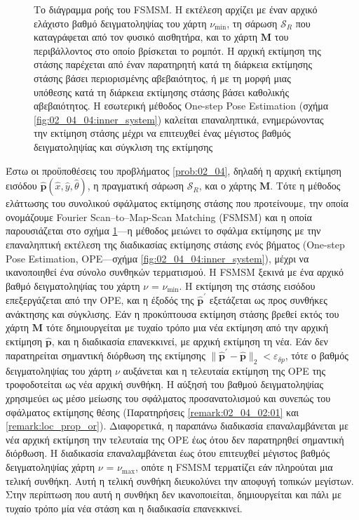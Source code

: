 \begin{figure}[!h]\centering
  
  \caption{\small Το διάγραμμα ροής του FSMSM. Η εκτέλεση αρχίζει με έναν αρχικό
           ελάχιστο βαθμό δειγματοληψίας του χάρτη $\nu_{\min}$, τη σάρωση
           $\mathcal{S}_R$ που καταγράφεται από τον φυσικό αισθητήρα, και το
           χάρτη $\bm{M}$ του περιβάλλοντος στο οποίο βρίσκεται το ρομπότ. Η
           αρχική εκτίμηση της στάσης παρέχεται από έναν παρατηρητή κατά τη
           διάρκεια εκτίμησης στάσης βάσει περιορισμένης αβεβαιότητος, ή με τη
           μορφή μιας υπόθεσης κατά τη διάρκεια εκτίμησης στάσης βάσει καθολικής
           αβεβαιότητος. Η εσωτερική μέθοδος One-step Pose Estimation (σχήμα
           \ref{fig:02_04_04:inner_system}) καλείται επαναληπτικά, ενημερώνοντας
           την εκτίμηση στάσης μέχρι να επιτευχθεί ένας μέγιστος βαθμός
           δειγματοληψίας και σύγκλιση της εκτίμησης}
  \label{fig:02_04_04:outer_system}
\end{figure}

Έστω οι προϋποθέσεις του προβλήματος \ref{prob:02_04}, δηλαδή η αρχική εκτίμηση
εισόδου $\hat{\bm{p}}(\hat{x}, \hat{y}, \hat{\theta})$, η πραγματική σάρωση
$\mathcal{S}_R$, και ο χάρτης $\bm{M}$. Τότε η μέθοδος ελάττωσης του συνολικού
σφάλματος εκτίμησης στάσης που προτείνουμε, την οποία ονομάζουμε Fourier
Scan--to--Map-Scan Matching (FSMSM) και η οποία παρουσιάζεται στο σχήμα
\ref{fig:02_04_04:outer_system}---η μέθοδος μειώνει το σφάλμα εκτίμησης με την
επαναληπτική εκτέλεση της διαδικασίας εκτίμησης στάσης ενός βήματος (One-step
Pose Estimation, OPE---σχήμα \ref{fig:02_04_04:inner_system}), μέχρι να
ικανοποιηθεί ένα σύνολο συνθηκών τερματισμού. Η FSMSM ξεκινά με ένα αρχικό
βαθμό δειγματοληψίας του χάρτη $\nu$ = $\nu_{\min}$. Η εκτίμηση της στάσης
εισόδου επεξεργάζεται από την OPE, και η έξοδός της $\hat{\bm{p}}^\prime$
εξετάζεται ως προς συνθήκες ανάκτησης και σύγκλισης. Εάν η προκύπτουσα εκτίμηση
στάσης βρεθεί εκτός του χάρτη $\bm{M}$ τότε δημιουργείται με τυχαίο τρόπο μια νέα
εκτίμηση από την αρχική εκτίμηση $\hat{\bm{p}}$, και η διαδικασία επανεκκινεί,
με αρχική εκτίμηση τη νέα. Εάν δεν παρατηρείται σημαντική διόρθωση της
εκτίμησης $\|\hat{\bm{p}}^\prime-\hat{\bm{p}}\|_2 < \varepsilon_{\delta p}$,
τότε ο βαθμός δειγματοληψίας του χάρτη $\nu$ αυξάνεται και η τελευταία εκτίμηση
της OPE της τροφοδοτείται ως νέα αρχική συνθήκη. Η αύξησή του βαθμού
δειγματοληψίας χρησιμεύει ως μέσο μείωσης του σφάλματος προσανατολισμού και
συνεπώς του σφάλματος εκτίμησης θέσης (Παρατηρήσεις \ref{remark:02_04_02:01}
και \ref{remark:loc_prop_or}). Διαφορετικά, η παραπάνω διαδικασία
επαναλαμβάνεται με νέα αρχική εκτίμηση την τελευταία της OPE έως ότου δεν
παρατηρηθεί σημαντική διόρθωση. Η διαδικασία επαναλαμβάνεται έως ότου
επιτευχθεί μέγιστος βαθμός δειγματοληψίας χάρτη $\nu$ = $\nu_{\max}$, οπότε η
FSMSM τερματίζει εάν πληρούται μια τελική συνθήκη. Αυτή η τελική συνθήκη
διευκολύνει την αποφυγή τοπικών μεγίστων. Στην περίπτωση που αυτή η συνθήκη δεν
ικανοποιείται, δημιουργείται και πάλι με τυχαίο τρόπο μία νέα στάση και η
διαδικασία επανεκκινεί.


